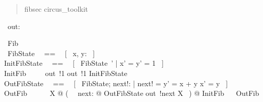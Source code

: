 \documentclass{article}
\newenvironment{zsection}{\begin{quotation}}{\end{quotation}}
\begin{document}
\begin{zsection}
   \SECTION fibsec \parents circus\_toolkit
\end{zsection}

\begin{circus}
    \circchannel\ out: \nat
\end{circus}

\begin{circus}
    \circprocess\ Fib ~~\circdef~~ \circbegin \\
    \circstate\ FibState ~~==~~ [~ x, y: \nat ~] \\
    InitFibState ~~==~~ [~ FibState~' | x' = y' = 1 ~] \\
    InitFib ~~\circdef~~ out~!1 \then out~!1 \then InitFibState \\
    OutFibState ~~==~~ [~ \Delta FibState; next!: \nat | next! = y' = x + y \land x' = y ~] \\
    OutFib ~~\circdef~~ \circmu\ X @ (~ \circvar\ next: \nat @ OutFibState \circseq out~!next \then X ~)
    @ InitFib ~\circseq~ OutFib \\
    \circend
\end{circus}
\end{document}
